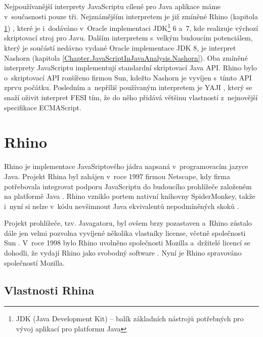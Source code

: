 Nejpoužívanější interprety JavaScriptu cílené pro Java aplikace máme v~současnosti pouze tři. Nejznámějším interpretem je již zmíněné Rhino (kapitola \ref{Chapter.JavaScriptInJavaAnalysis.Rhino}) \cite{Bibliography.Rhino.Docs}, které je i~dodáváno v~Oracle implementaci JDK\footnote{JDK (Java Development Kit) -- balík základních nástrojů potřebných pro vývoj aplikací pro platformu Java} 6 a~7, kde realizuje výchozí skriptovací stroj pro Javu. Dalším interpretem s~velkým budoucím potenciálem, který je součástí nedávno vydané Oracle implementace JDK 8, je interpret Nashorn \cite{Bibliography.Nashorn.Project} (kapitola \ref{Chapter.JavaScriptInJavaAnalysis.Nashorn}). Oba zmíněné interprety JavaScriptu implementují standardní skriptovací Java API. Rhino bylo o~skriptovací API rozšířeno firmou Sun, kdežto Nashorn je vyvíjen s~tímto API zprvu počátku. Posledním a~nepříliš používaným interpretem je YAJI \cite{Bibliography.YAJI.Project}, který se snaží oživit interpret FESI \cite{Bibliography.FESI.Project} tím, že do něho přidává většinu vlastností z~nejnovější specifikace ECMAScript.

\section{Rhino}
\label{Chapter.JavaScriptInJavaAnalysis.Rhino}

Rhino je implementace JavaSriptového jádra napsaná v~programovacím jazyce Java. Projekt Rhina byl zahájen v~roce 1997 firmou Netscape, kdy firma potřebovala integrovat podporu JavaScriptu do budoucího prohlížeče založeném na platformě Java \cite{Bibliography.Rhino.History}. Rhino vzniklo portem nativní knihovny SpiderMonkey, takže i~nyní si nelze v~kódu nevšimnout Java ekvivalentů nepodmíněných skoků \cite{Bibliography.Rhino.History}.

Projekt prohlížeče, tzv. Javagatoru, byl ovšem brzy pozastaven a~Rhino zůstalo dále jen velmi pozvolna vyvíjené několika vlastníky license, včetně společnosti Sun \cite{Bibliography.Rhino.History}. V~roce 1998 bylo Rhino uvolněno společnosti Mozilla a~držitelé licencí se dohodli, že vydají Rhino jako svobodný software \cite{Bibliography.Rhino.History}. Nyní je Rhino spravováno společností Mozilla.

\subsection{Vlastnosti Rhina}
\label{Chapter.JavaScriptInJavaAnalysis.Rhino.RhinoFeatures}

